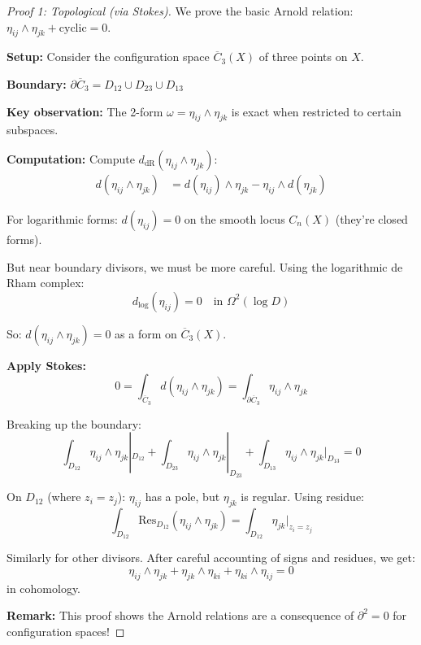 \begin{proof}[Proof 1: Topological (via Stokes)]
We prove the basic Arnold relation: $\eta_{ij} \wedge \eta_{jk} + \text{cyclic} = 0$.

\textbf{Setup:} Consider the configuration space $\overline{C}_3(X)$ of three points on $X$.

\textbf{Boundary:} $\partial\overline{C}_3 = D_{12} \cup D_{23} \cup D_{13}$

\textbf{Key observation:} The 2-form $\omega = \eta_{ij} \wedge \eta_{jk}$ is exact when restricted to certain subspaces.

\textbf{Computation:} Compute $d_{\text{dR}}(\eta_{ij} \wedge \eta_{jk})$:
\begin{align*}
d(\eta_{ij} \wedge \eta_{jk}) &= d(\eta_{ij}) \wedge \eta_{jk} - \eta_{ij} \wedge d(\eta_{jk})
\end{align*}

For logarithmic forms: $d(\eta_{ij}) = 0$ on the smooth locus $C_n(X)$ (they're closed forms).

But near boundary divisors, we must be more careful. Using the logarithmic de Rham complex:
$$d_{\log}(\eta_{ij}) = 0 \quad \text{in } \Omega^2(\log D)$$

So: $d(\eta_{ij} \wedge \eta_{jk}) = 0$ as a form on $\overline{C}_3(X)$.

\textbf{Apply Stokes:}
$$0 = \int_{\overline{C}_3} d(\eta_{ij} \wedge \eta_{jk}) = \int_{\partial\overline{C}_3} \eta_{ij} \wedge \eta_{jk}$$

Breaking up the boundary:
$$\int_{D_{12}} \eta_{ij} \wedge \eta_{jk}|_{D_{12}} + \int_{D_{23}} \eta_{ij} \wedge \eta_{jk}|_{D_{23}} + \int_{D_{13}} \eta_{ij} \wedge \eta_{jk}|_{D_{13}} = 0$$

On $D_{12}$ (where $z_i = z_j$): $\eta_{ij}$ has a pole, but $\eta_{jk}$ is regular.
Using residue:
$$\int_{D_{12}} \text{Res}_{D_{12}}(\eta_{ij} \wedge \eta_{jk}) = \int_{D_{12}} \eta_{jk}|_{z_i=z_j}$$

Similarly for other divisors. After careful accounting of signs and residues, we get:
$$\eta_{ij} \wedge \eta_{jk} + \eta_{jk} \wedge \eta_{ki} + \eta_{ki} \wedge \eta_{ij} = 0$$
in cohomology.

\textbf{Remark:} This proof shows the Arnold relations are a consequence of $\partial^2 = 0$ for configuration spaces!
\end{proof}


